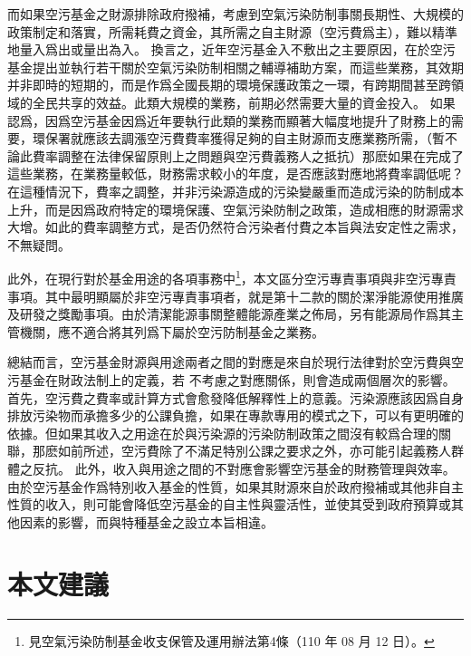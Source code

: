 \documentclass[12pt,a4paper]{article}
\begin{document}


而如果空污基金之財源排除政府撥補，考慮到空氣污染防制事關長期性、大規模的政策制定和落實，所需耗費之資金，其所需之自主財源（空污費爲主），難以精準地量入爲出或量出為入。
換言之，近年空污基金入不敷出之主要原因，在於空污基金提出並執行若干關於空氣污染防制相關之輔導補助方案，而這些業務，其效期并非即時的短期的，而是作爲全國長期的環境保護政策之一環，有跨期間甚至跨領域的全民共享的效益。此類大規模的業務，前期必然需要大量的資金投入。
如果認爲，因爲空污基金因爲近年要執行此類的業務而顯著大幅度地提升了財務上的需要，環保署就應該去調漲空污費費率獲得足夠的自主財源而支應業務所需，（暫不論此費率調整在法律保留原則上之問題與空污費義務人之抵抗）那麽如果在完成了這些業務，在業務量較低，財務需求較小的年度，是否應該對應地將費率調低呢？在這種情況下，費率之調整，并非污染源造成的污染變嚴重而造成污染的防制成本上升，而是因爲政府特定的環境保護、空氣污染防制之政策，造成相應的財源需求大增。如此的費率調整方式，是否仍然符合污染者付費之本旨與法安定性之需求，不無疑問。

此外，在現行對於基金用途的各項事務中\footnote{見空氣污染防制基金收支保管及運用辦法第4條（110 年 08 月 12 日）。}，本文區分空污專責事項與非空污專責事項。其中最明顯屬於非空污專責事項者，就是第十二款的關於潔淨能源使用推廣及研發之獎勵事項。由於清潔能源事關整體能源產業之佈局，另有能源局作爲其主管機關，應不適合將其列爲下屬於空污防制基金之業務。


總結而言，空污基金財源與用途兩者之間的對應是來自於現行法律對於空污費與空污基金在財政法制上的定義，若
不考慮之對應關係，則會造成兩個層次的影響。首先，空污費之費率或計算方式會愈發降低解釋性上的意義。污染源應該因爲自身排放污染物而承擔多少的公課負擔，如果在專款專用的模式之下，可以有更明確的依據。但如果其收入之用途在於與污染源的污染防制政策之間沒有較爲合理的關聯，那麽如前所述，空污費除了不滿足特別公課之要求之外，亦可能引起義務人群體之反抗。
此外，收入與用途之間的不對應會影響空污基金的財務管理與效率。由於空污基金作爲特別收入基金的性質，如果其財源來自於政府撥補或其他非自主性質的收入，則可能會降低空污基金的自主性與靈活性，並使其受到政府預算或其他因素的影響，而與特種基金之設立本旨相違。


\section{本文建議}
\end{document}
